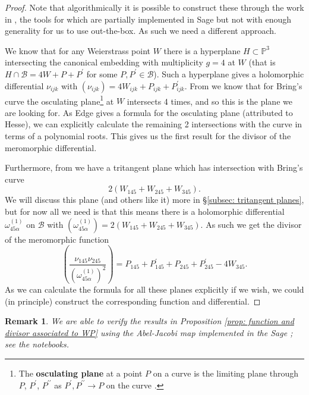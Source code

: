 \documentclass{amsart}
\newtheorem{remark}[theorem]{Remark}
\newcommand{\bam}[1]{\textbf{#1}}
\newcommand{\pround}[1]{\left( #1 \right)}
\begin{document}
\begin{proof}
Note that algorithmically it is possible to construct these through the work in \cite{Hess2002}, the tools for which are partially implemented in Sage but not with enough generality for us to use out-the-box. As such we need a different approach.

We know that for any Weierstrass point $W$ there is a hyperplane $H \subset \mathbb{P}^3$ intersecting the canonical embedding with multiplicity $g=4$ at $W$ (that is $H \cap \mathcal{B} = 4W + P + P^\prime$ for some $P, P^\prime \in \mathcal{B}$). Such a hyperplane gives a holomorphic differential $\nu_{ijk}$ with $(\nu_{ijk}) = 4W_{ijk} + P_{ijk} + P^\prime_{ijk}$. From \cite{Edge1978} we know that for Bring's curve the osculating plane\footnote{The \bam{osculating plane} at a point $P$ on a curve is the limiting plane through $P$, $P^\prime$, $P^{\prime \prime}$ as $P^\prime, P^{\prime \prime} \to P$ on the curve \cite{Salmon1862}.} at $W$ intersects 4 times, and so this is the plane we are looking for. As Edge gives a formula for the osculating plane (attributed to Hesse), we can explicitly calculate the remaining 2 intersections with the curve in terms of a polynomial roots. This gives us the first result for the divisor of the meromorphic differential.

Furthermore, from \cite{Edge1981} we have a tritangent plane which has intersection with Bring's curve
\[
2(W_{145} + W_{245} + W_{345})  . 
\]
We will discuss this plane (and others like it) more in \S\ref{subsec: tritangent planes}, but for now all we need is that this means there is a holomorphic differential $\omega_{45\alpha}^{(1)}$ on $\mathcal{B}$ with $(\omega_{45\alpha}^{(1)}) = 2(W_{145} + W_{245} + W_{345})$. As such we get the divisor of the meromorphic function 
\[
\pround{\frac{\nu_{145}\nu_{245}}{\pround{\omega_{45\alpha}^{(1)}}^2}} = P_{145} + P_{145}^\prime + P_{245} + P_{245}^\prime -4W_{345}  . 
\]
As we can calculate the formula for all these planes explicitly if we wish, we could (in principle) construct the corresponding function and differential. 
\end{proof}
\begin{remark}
We are able to verify the results in Proposition \ref{prop: function and divisor associated to WP} using the Abel-Jacobi map implemented in the Sage \cite{DisneyHogg2021}; see the notebooks. 
\end{remark}
\end{document}
